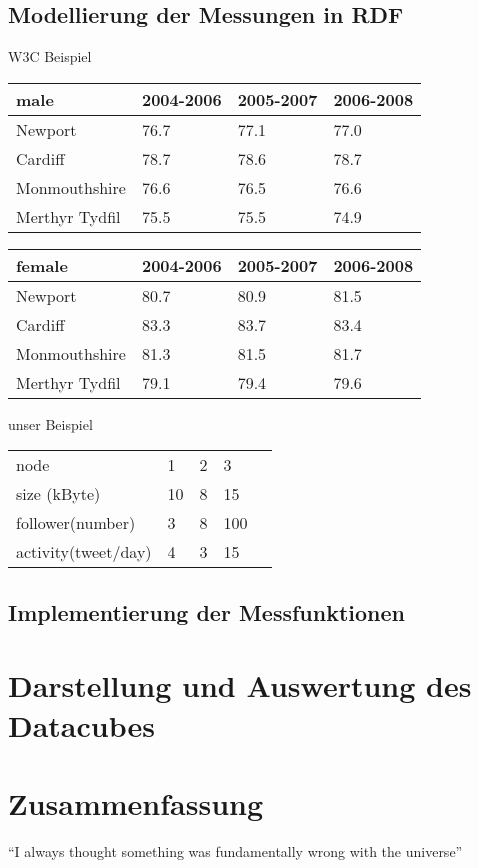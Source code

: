 \documentclass{article}
\begin{document}
\subsection{Modellierung der Messungen in RDF}

W3C Beispiel

\begin{table}[h]
\begin{tabular}{|l|l|l|l|}
\hline
male           & 2004-2006 & 2005-2007 & 2006-2008 \\ \hline
Newport        & 76.7      & 77.1      & 77.0      \\ \hline
Cardiff        & 78.7      & 78.6      & 78.7      \\ \hline
Monmouthshire  & 76.6      & 76.5      & 76.6      \\ \hline
Merthyr Tydfil & 75.5      & 75.5      & 74.9      \\ \hline
\end{tabular}
\end{table}

\begin{table}[h]
\begin{tabular}{|l|l|l|l|}
\hline
female         & 2004-2006 & 2005-2007 & 2006-2008 \\ \hline
Newport        & 80.7      & 80.9      & 81.5      \\ \hline
Cardiff        & 83.3      & 83.7      & 83.4      \\ \hline
Monmouthshire  & 81.3      & 81.5      & 81.7      \\ \hline
Merthyr Tydfil & 79.1      & 79.4      & 79.6      \\ \hline
\end{tabular}
\end{table}

unser Beispiel

\begin{table}[h]
\begin{tabular}{|l|l|l|l|l}
\cline{1-4}
node           & 1  & 2 & 3   &  \\ \cline{1-4}
size (kByte)   & 10 & 8 & 15  &  \\ \cline{1-4}
follower(number)       & 3  & 8 & 100 &  \\ \cline{1-4}
activity(tweet/day) & 4  & 3 & 15  &  \\ \cline{1-4}
\end{tabular}
\end{table}

\subsection{Implementierung der Messfunktionen}

\section{Darstellung und Auswertung des Datacubes}

\section{Zusammenfassung}
``I always thought something was fundamentally wrong with the universe'' \citep{adams1995hitchhiker}



\end{document}
